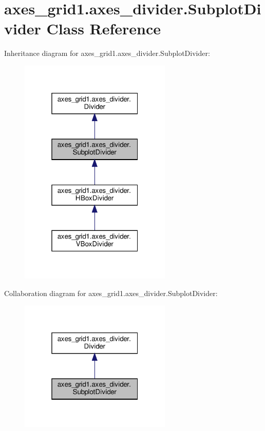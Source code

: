 \hypertarget{classaxes__grid1_1_1axes__divider_1_1SubplotDivider}{}\section{axes\+\_\+grid1.\+axes\+\_\+divider.\+Subplot\+Divider Class Reference}
\label{classaxes__grid1_1_1axes__divider_1_1SubplotDivider}


Inheritance diagram for axes\+\_\+grid1.\+axes\+\_\+divider.\+Subplot\+Divider\+:
\nopagebreak
\begin{figure}[H]
\begin{center}
\leavevmode
\includegraphics[width=205pt]{classaxes__grid1_1_1axes__divider_1_1SubplotDivider__inherit__graph}
\end{center}
\end{figure}


Collaboration diagram for axes\+\_\+grid1.\+axes\+\_\+divider.\+Subplot\+Divider\+:
\nopagebreak
\begin{figure}[H]
\begin{center}
\leavevmode
\includegraphics[width=205pt]{classaxes__grid1_1_1axes__divider_1_1SubplotDivider__coll__graph}
\end{center}
\end{figure}
